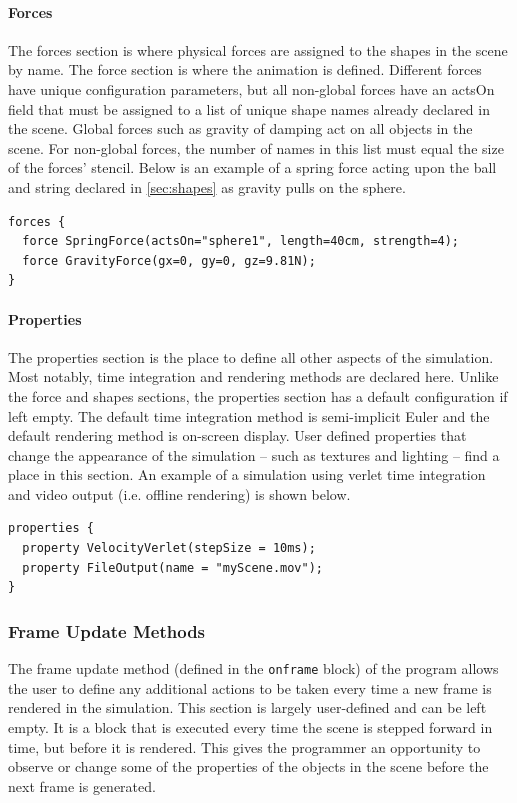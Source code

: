 \paragraph{Forces}

The forces section is where physical forces are assigned to the shapes
in the scene by name. The force section is where the animation is
defined. Different forces have unique configuration parameters, but
all non-global forces have an actsOn field that must be assigned to a
list of unique shape names already declared in the scene. Global
forces such as gravity of damping act on all objects in the scene. For
non-global forces, the number of names in this list must equal the
size of the forces' stencil. Below is an example of a spring force
acting upon the ball and string declared in \ref{sec:shapes} as
gravity pulls on the sphere.

\begin{verbatim}
forces {
  force SpringForce(actsOn="sphere1", length=40cm, strength=4);
  force GravityForce(gx=0, gy=0, gz=9.81N);
}
\end{verbatim}
 
\paragraph{Properties}

The properties section is the place to define all other aspects of the
simulation. Most notably, time integration and rendering methods are
declared here. Unlike the force and shapes sections, the properties
section has a default configuration if left empty. The default time
integration method is semi-implicit Euler and the default rendering
method is on-screen display. User defined properties that change the
appearance of the simulation -- such as textures and lighting -- find a
place in this section. An example of a simulation using verlet
time integration and video output (i.e. offline rendering) is shown
below.

\begin{verbatim}
properties {
  property VelocityVerlet(stepSize = 10ms);
  property FileOutput(name = "myScene.mov");
}
\end{verbatim}
 
\subsubsection{Frame Update Methods}
The frame update method (defined in the \texttt{onframe} block) of the
program allows the user to define any additional actions to be taken
every time a new frame is rendered in the simulation. This section is
largely user-defined and can be left empty. It is a block that is
executed every time the scene is stepped forward in time, but before
it is rendered. This gives the programmer an opportunity to observe or
change some of the properties of the objects in the scene before the
next frame is generated.

